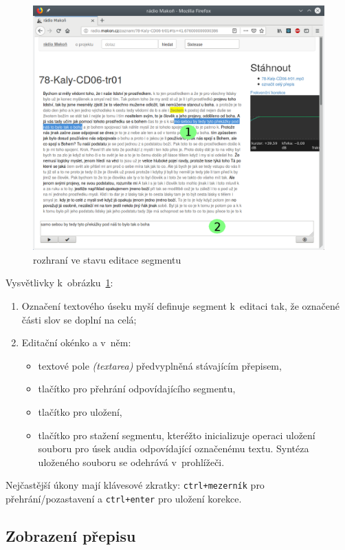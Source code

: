 \begin{figure}[htpb]
\includegraphics[scale=0.7]{rc/radio-makon-cs-2-lab.png}
\caption{rozhraní ve stavu editace segmentu}
\label{fig:scn2lab}
\end{figure}

Vysvětlivky k~obrázku~\ref{fig:scn2lab}:
\begin{enumerate}
\item{
    Označení textového úseku myší definuje segment k~editaci tak, že označené
    části slov se doplní na celá;
}
\item{
    Editační okénko a v~něm:
    \begin{itemize}
    \item{textové pole {\em (textarea)} předvyplněná stávajícím přepisem,}
    \item{tlačítko pro přehrání odpovídajícího segmentu,}
    \item{tlačítko pro uložení,}
    \item{
        tlačítko pro stažení segmentu, kteréžto inicializuje operaci uložení
        souboru pro úsek audia odpovídající označenému textu. Syntéza uloženého
        souboru se odehrává v~prohlížeči.
    }
    \end{itemize}
}
\end{enumerate}

Nejčastější úkony mají klávesové zkratky: \texttt{ctrl+mezerník} pro
přehrání/pozastavení a \texttt{ctrl+enter} pro uložení korekce.

\subsection{Zobrazení přepisu}

